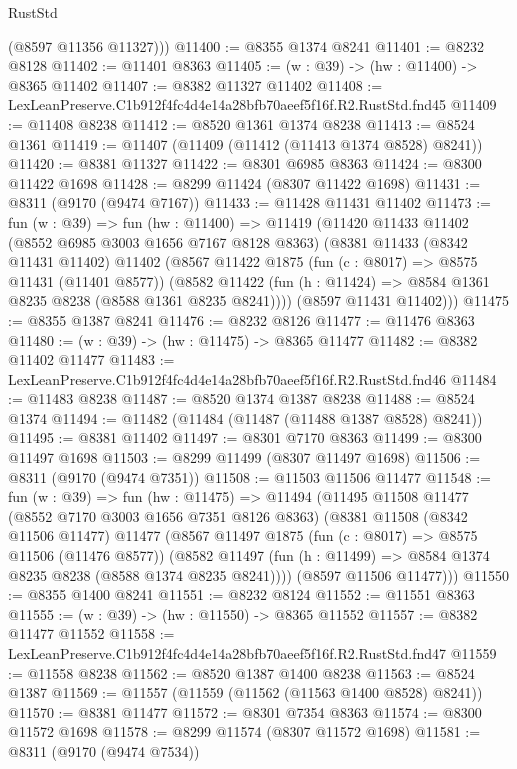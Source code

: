 \begin{lexlean}{RustStd}
\begin{coremodule}
        (@8597 @11356 @11327)))
@11400 := @8355 @1374 @8241
@11401 := @8232 @8128
@11402 := @11401 @8363
@11405 := (w : @39) -> (hw : @11400) -> @8365 @11402
@11407 := @8382 @11327 @11402
@11408 := LexLeanPreserve.C1b912f4fc4d4e14a28bfb70aeef5f16f.R2.RustStd.fnd45
@11409 := @11408 @8238
@11412 := @8520 @1361 @1374 @8238
@11413 := @8524 @1361
@11419 := @11407 (@11409 (@11412 (@11413 @1374 @8528) @8241))
@11420 := @8381 @11327
@11422 := @8301 @6985 @8363
@11424 := @8300 @11422 @1698
@11428 := @8299 @11424 (@8307 @11422 @1698)
@11431 := @8311 (@9170 (@9474 @7167))
@11433 := @11428 @11431 @11402
@11473 := fun (w : @39) =>
  fun (hw : @11400) =>
  @11419
    (@11420
      @11433
      @11402
      (@8552 @6985 @3003 @1656 @7167 @8128 @8363)
      (@8381
        @11433
        (@8342 @11431 @11402)
        @11402
        (@8567
          @11422
          @1875
          (fun (c : @8017) => @8575 @11431 (@11401 @8577))
          (@8582 @11422 (fun (h : @11424) => @8584 @1361 @8235 @8238 (@8588 @1361 @8235 @8241))))
        (@8597 @11431 @11402)))
@11475 := @8355 @1387 @8241
@11476 := @8232 @8126
@11477 := @11476 @8363
@11480 := (w : @39) -> (hw : @11475) -> @8365 @11477
@11482 := @8382 @11402 @11477
@11483 := LexLeanPreserve.C1b912f4fc4d4e14a28bfb70aeef5f16f.R2.RustStd.fnd46
@11484 := @11483 @8238
@11487 := @8520 @1374 @1387 @8238
@11488 := @8524 @1374
@11494 := @11482 (@11484 (@11487 (@11488 @1387 @8528) @8241))
@11495 := @8381 @11402
@11497 := @8301 @7170 @8363
@11499 := @8300 @11497 @1698
@11503 := @8299 @11499 (@8307 @11497 @1698)
@11506 := @8311 (@9170 (@9474 @7351))
@11508 := @11503 @11506 @11477
@11548 := fun (w : @39) =>
  fun (hw : @11475) =>
  @11494
    (@11495
      @11508
      @11477
      (@8552 @7170 @3003 @1656 @7351 @8126 @8363)
      (@8381
        @11508
        (@8342 @11506 @11477)
        @11477
        (@8567
          @11497
          @1875
          (fun (c : @8017) => @8575 @11506 (@11476 @8577))
          (@8582 @11497 (fun (h : @11499) => @8584 @1374 @8235 @8238 (@8588 @1374 @8235 @8241))))
        (@8597 @11506 @11477)))
@11550 := @8355 @1400 @8241
@11551 := @8232 @8124
@11552 := @11551 @8363
@11555 := (w : @39) -> (hw : @11550) -> @8365 @11552
@11557 := @8382 @11477 @11552
@11558 := LexLeanPreserve.C1b912f4fc4d4e14a28bfb70aeef5f16f.R2.RustStd.fnd47
@11559 := @11558 @8238
@11562 := @8520 @1387 @1400 @8238
@11563 := @8524 @1387
@11569 := @11557 (@11559 (@11562 (@11563 @1400 @8528) @8241))
@11570 := @8381 @11477
@11572 := @8301 @7354 @8363
@11574 := @8300 @11572 @1698
@11578 := @8299 @11574 (@8307 @11572 @1698)
@11581 := @8311 (@9170 (@9474 @7534))

\end{coremodule}
\end{lexlean}
